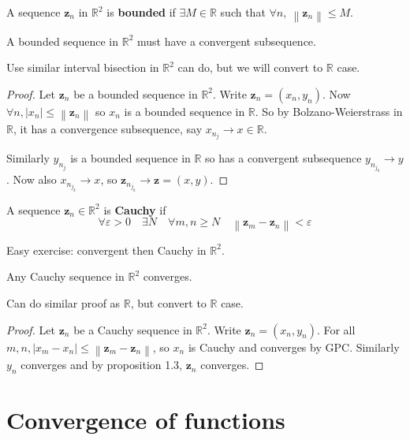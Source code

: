 \documentclass[a4paper,11pt]{article}
\renewcommand{\epsilon}{\varepsilon}
\begin{document}
\begin{definition}
    A sequence $\mathbf{z}_n$ in $ \mathbb{R}^{2} $ is \textbf{bounded} if $\exists M\in \mathbb{R}$ such that $ \forall n,\ \left\| \mathbf{z}_n \right\|\le M $. 
\end{definition}

\begin{theorem}
    A bounded sequence in $ \mathbb{R}^{2} $ must have a convergent subsequence.
\end{theorem}
Use similar interval bisection in $ \mathbb{R}^{2} $ can do, but we will convert to $\mathbb{R}$ case. 

\begin{proof}
    Let $ \mathbf{z}_n $ be a bounded sequence in $ \mathbb{R}^{2} $. Write $ \mathbf{z}_n = (x_n,y_n) $. Now $ \forall n, |x_n| \le \left\| \mathbf{z}_n \right\| $ so $x_n$ is a bounded sequence in $ \mathbb{R} $. So by Bolzano-Weierstrass in $ \mathbb{R} $, it has a convergence subsequence, say $ x_{n_j}\to x\in \mathbb{R} $. 

    Similarly $ y_{n_j} $ is a bounded sequence in $ \mathbb{R} $ so has a convergent subsequence $ y_{n_{j_k}}\to y $. Now also $ x_{n_{j_k}} \to x$, so $ \mathbf{z}_{n_{j_k}}\to \mathbf{z}= (x,y) $. 
\end{proof}

\begin{definition}
    A sequence $ \mathbf{z}_n\in \mathbb{R}^{2} $ is \textbf{Cauchy} if 
    \[
        \forall \epsilon>0\quad \exists N\quad \forall m,n\ge N\quad \left\| \mathbf{z}_m-\mathbf{z}_n \right\|<\epsilon
    \]
\end{definition}
Easy exercise: convergent then Cauchy in $ \mathbb{R}^{2} $. 

\begin{theorem}
    Any Cauchy sequence in $ \mathbb{R}^{2} $ converges. 
\end{theorem}
Can do similar proof as $\mathbb{R}$, but convert to $\mathbb{R}$ case. 
\begin{proof}
    Let $ \mathbf{z}_n $ be a Cauchy sequence in $ \mathbb{R}^{2} $. Write $ \mathbf{z}_n = (x_n,y_n) $. For all $ m,n, |x_m-x_n| \le \left\| \mathbf{z}_m-\mathbf{z}_n \right\| $, so $ x_n $ is Cauchy and converges by GPC. Similarly $ y_n $ converges and by proposition 1.3, $ \mathbf{z}_n $ converges.
\end{proof}

\section{Convergence of functions}
\end{document}
